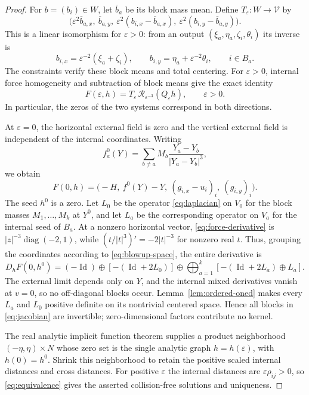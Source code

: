 \documentclass[11pt,a4paper]{amsart}
\numberwithin{equation}{section}
\newcommand{\eps}{\varepsilon}
\DeclareMathOperator{\diag}{diag}
\DeclareMathOperator{\Id}{Id}
\newcommand{\cR}{\mathcal R}
\newcommand{\cV}{\mathcal V}
\begin{document}
\begin{proof}
For $b=(b_i)\in W$, let $\overline b_a$ be its block mass mean.
Define $T_\eps:W\to\cV$ by
\begin{equation}\label{eq:residual-transform}
 \bigl(\eps^2\overline b_{a,x},\ \overline b_{a,y},\
       \eps^2(b_{i,x}-\overline b_{a,x}),\
       \eps^2(b_{i,y}-\overline b_{a,y})\bigr).
\end{equation}
This is a linear isomorphism for $\eps>0$: from an output
$(\xi_a,\eta_a,\zeta_i,\theta_i)$ its inverse is
\[
 b_{i,x}=\eps^{-2}(\xi_a+\zeta_i),\qquad
 b_{i,y}=\eta_a+\eps^{-2}\theta_i,\qquad i\in B_a.
\]
The constraints verify these block means and total centering.
For $\eps>0$, internal force homogeneity and subtraction of block
means give the exact identity
\begin{equation}\label{eq:equivalence}
 F(\eps,h)=T_\eps\,\cR_{\eps^{-3}}(Q_\eps h),\qquad \eps>0.
\end{equation}
In particular, the zeros of the two systems correspond in both directions.

At $\eps=0$, the horizontal external field is zero and the vertical
external field is independent of the internal coordinates. Writing
\[
 f_a^0(Y)=\sum_{b\ne a}M_b\frac{Y_a-Y_b}{|Y_a-Y_b|^3},
\]
we obtain
\begin{equation}\label{eq:zero-residual}
 F(0,h)=\bigl(-H,\ f^0(Y)-Y,\ (g_{i,x}-u_i)_i,\ (g_{i,y})_i\bigr).
\end{equation}
The seed $h^0$ is a zero. Let $L_0$ be the operator
\eqref{eq:laplacian} on $V_0$ for the block masses
$M_1,\ldots,M_k$ at $Y^0$, and let $L_a$ be the corresponding
operator on $V_a$ for the internal seed of $B_a$.
At a nonzero horizontal vector, \eqref{eq:force-derivative} is
$|z|^{-3}\diag(-2,1)$, while
$(t/|t|^3)'=-2|t|^{-3}$ for nonzero real $t$. Thus, grouping the
coordinates according to \eqref{eq:blowup-space}, the entire derivative is
\begin{equation}\label{eq:jacobian}
 D_hF(0,h^0)=(-\Id)\oplus[-(\Id+2L_0)]
       \oplus\bigoplus_{a=1}^k[-(\Id+2L_a)\oplus L_a].
\end{equation}
The external limit depends only on $Y$, and the internal mixed
derivatives vanish at $v=0$, so no off-diagonal blocks occur.
Lemma~\ref{lem:ordered-oned} makes every $L_a$ and $L_0$ positive
definite on its nontrivial centered space. Hence all blocks in
\eqref{eq:jacobian} are invertible; zero-dimensional factors contribute
no kernel.

The real analytic implicit function theorem supplies a product
neighborhood $(-\eta,\eta)\times N$ whose zero set is the single
analytic graph $h=h(\eps)$, with $h(0)=h^0$. Shrink this neighborhood
to retain the positive scaled internal distances and cross distances.
For positive $\eps$ the internal distances are $\eps\rho_{ij}>0$,
so \eqref{eq:equivalence} gives the asserted collision-free solutions
and uniqueness.


\end{proof}
\end{document}
